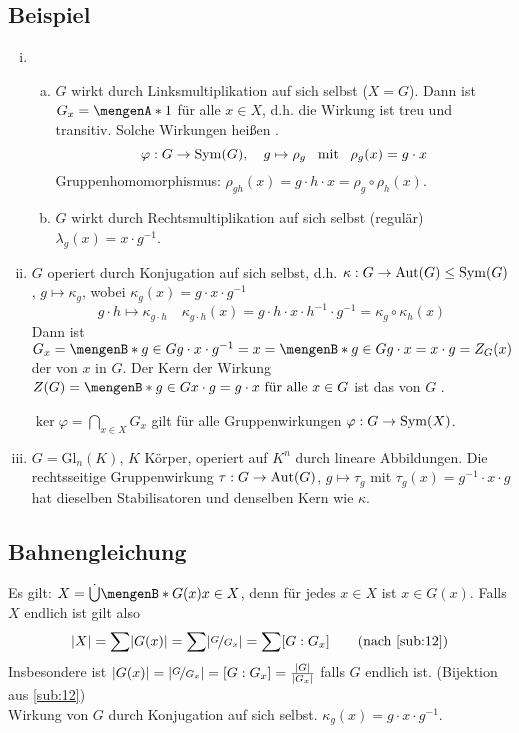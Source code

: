 \subsection[Beispiele für Gruppenwirkungen]{Beispiel} %
\label{sub:13}
\begin{enumerate}[(i)]
	\item\begin{enumerate}[(a)]
		\item $G$ wirkt durch Linksmultiplikation auf sich selbst ($X = G$). Dann ist $G_x = \set{1}$ für alle $x \in X$, d.h. die Wirkung ist treu und transitiv. Solche 
		Wirkungen heißen .
		\[
			\varphi : G \to \Sym(G) , \quad g \mapsto\rho_g \enspace \text{ mit } \enspace\rho_g(x) = g \cdot x	
		\]
		Gruppenhomomorphismus: $\rho_{g h} (x) = g \cdot h \cdot x = \rho_g \circ \rho_h (x)$.
		\item $G$ wirkt durch Rechtsmultiplikation auf sich selbst (regulär) $\lambda_g (x) = x \cdot g ^{-1}$.
	\end{enumerate}
	\item $G$ operiert durch Konjugation auf sich selbst, d.h. $\kappa : G  \to \Aut(G) \le \Sym(G)$, $g \mapsto \kappa_g$, wobei $\kappa_g(x) = g  \cdot x \cdot  g^{-1}$
	\[
		g \cdot  h \mapsto \kappa_{g \cdot h} \quad \kappa_{g \cdot h} (x) = g \cdot h\cdot x \cdot h ^{-1} \cdot g ^{-1}=\kappa_g \circ \kappa_h (x)
	\]
	Dann ist $G_x = \set[g \in G]{g \cdot x \cdot g ^{-1}= x} =\set[g \in G]{g \cdot x =x\cdot g} = Z_G(x) $ der  von $x$ in $G$. Der Kern der Wirkung
	$Z(G) = \set[g \in G]{x \cdot g = g \cdot x \text{ für alle } x \in G}$ ist das   von $G$ .
	
	 $\ker \varphi = \bigcap_{x \in X} G_x$ gilt für alle Gruppenwirkungen $\varphi : G \to \Sym(X)$.
	\item $G = \mathrm{Gl}_n(K)$, $K$ Körper, operiert auf $K^n$ durch lineare Abbildungen.
	 Die rechtsseitige Gruppenwirkung  $\tau : G  \to \Aut(G)$, $g \mapsto \tau_g$ mit $\tau_g(x) = g^{-1}  \cdot x \cdot  g$ 
	hat dieselben Stabilisatoren und denselben Kern wie $\kappa$.
\end{enumerate}

\subsection{Bahnengleichung} %
\label{sub:14}
Es gilt: $X = \dot \bigcup \set[G(x)]{x \in X} $, denn für jedes $x\in X$ ist $x\in G(x)$. Falls $X$ endlich ist gilt also
\[
	\abs*{X} = \sum \abs*{G(x)} = \sum \abs*{\nicefrac{G}{G_x}} = \sum [G : G_x] \tag{nach \ref{sub:12}}  
\]
Insbesondere ist $\abs*{G(x)} = \abs*{\nicefrac{G}{G_x}} = [G : G_x] = \frac{\abs*{G} }{\abs*{G_x} }  $ falls $G$ endlich ist. (Bijektion aus \ref{sub:12}) \\
 Wirkung von $G$ durch Konjugation auf sich selbst. $\kappa_g(x) = g  \cdot  x \cdot g^{-1}$.

